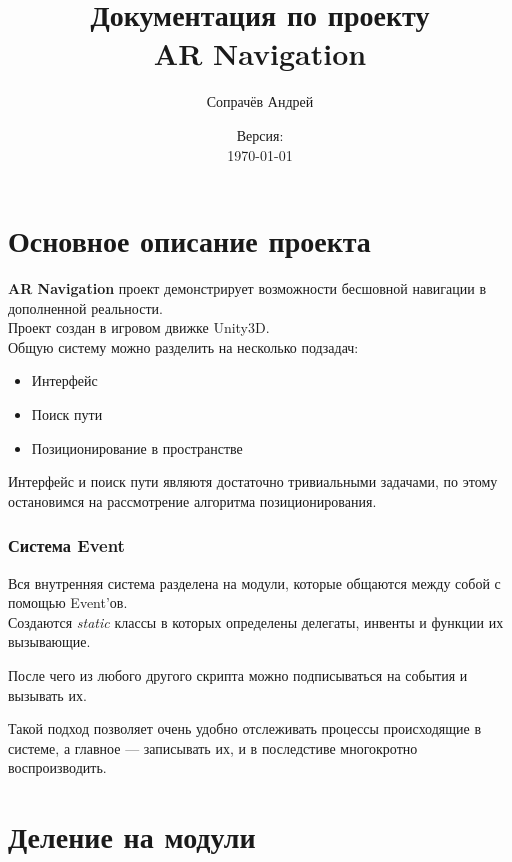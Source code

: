 \documentclass[a4paper, 11pt, titlepage]{article}
\title{Документация по проекту \\ \textbf{AR Navigation}}
\author{Сопрачёв Андрей}
\date{Версия: \versionnumber \\ \today}
\begin{document}
\sffamily
\maketitle

\tableofcontents
\newpage

\part{Основное описание проекта}
  \textbf{AR Navigation} проект демонстрирует возможности бесшовной навигации в дополненной реальности. \\
  Проект создан в игровом движке Unity3D.\\
  Общую систему можно разделить на несколько подзадач:
  \begin{itemize}
    \item Интерфейс
    \item Поиск пути
    \item Позиционирование в пространстве
  \end{itemize}
  Интерфейс и поиск пути являютя достаточно тривиальными задачами, по этому остановимся на рассмотрение алгоритма 
  позиционирования.

  \section{Система Event}
  Вся внутренняя система разделена на модули, которые общаются между собой с помощью Event'ов.\\
  Создаются \textit{static} классы в которых определены делегаты, инвенты и функции их вызывающие.

  \lstset{style=sharpc}
  
  После чего из любого другого скрипта можно подписываться на события и вызывать их.
  
  Такой подход позволяет очень удобно отслеживать процессы происходящие в системе, а главное --- записывать их, и в 
  последстиве многокротно воспроизводить.

\part{Деление на модули}
\end{document}
